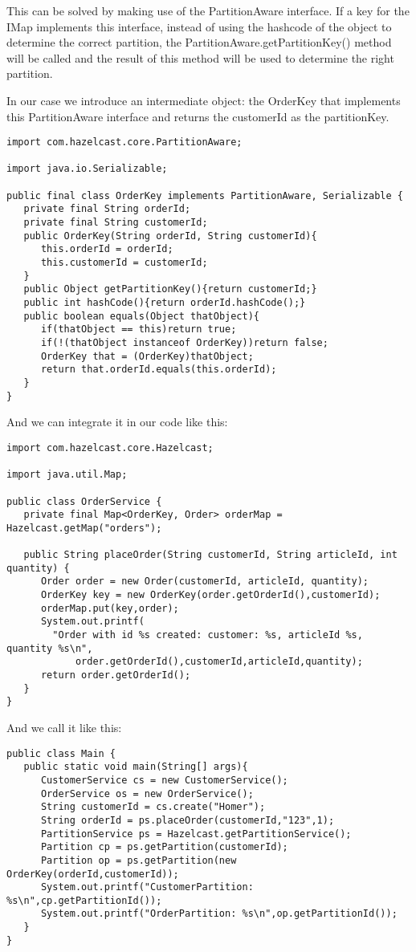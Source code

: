 This can be solved by making use of the PartitionAware interface. If a key for the IMap implements this interface, instead of using the hashcode of the object to determine the correct partition, the PartitionAware.getPartitionKey() method will be called and the result of this method will be used to determine the right partition.

In our case we introduce an intermediate object: the OrderKey that implements this PartitionAware interface and returns the customerId as the partitionKey.

\begin{verbatim}
import com.hazelcast.core.PartitionAware;

import java.io.Serializable;

public final class OrderKey implements PartitionAware, Serializable {
   private final String orderId;
   private final String customerId;
   public OrderKey(String orderId, String customerId){
      this.orderId = orderId;
      this.customerId = customerId;
   }
   public Object getPartitionKey(){return customerId;}
   public int hashCode(){return orderId.hashCode();}
   public boolean equals(Object thatObject){
      if(thatObject == this)return true;
      if(!(thatObject instanceof OrderKey))return false;
      OrderKey that = (OrderKey)thatObject;
      return that.orderId.equals(this.orderId);
   }
}
\end{verbatim}

And we can integrate it in our code like this:

\begin{verbatim}
import com.hazelcast.core.Hazelcast;

import java.util.Map;

public class OrderService {
   private final Map<OrderKey, Order> orderMap = Hazelcast.getMap("orders");

   public String placeOrder(String customerId, String articleId, int quantity) {
      Order order = new Order(customerId, articleId, quantity);
      OrderKey key = new OrderKey(order.getOrderId(),customerId);
      orderMap.put(key,order);
      System.out.printf(
		"Order with id %s created: customer: %s, articleId %s, quantity %s\n",
         	order.getOrderId(),customerId,articleId,quantity);
      return order.getOrderId();
   }
}
\end{verbatim}

And we call it like this:

\begin{verbatim}
public class Main {
   public static void main(String[] args){
      CustomerService cs = new CustomerService();
      OrderService os = new OrderService();
      String customerId = cs.create("Homer");
      String orderId = ps.placeOrder(customerId,"123",1);
      PartitionService ps = Hazelcast.getPartitionService();
      Partition cp = ps.getPartition(customerId);
      Partition op = ps.getPartition(new OrderKey(orderId,customerId));
      System.out.printf("CustomerPartition: %s\n",cp.getPartitionId());
      System.out.printf("OrderPartition: %s\n",op.getPartitionId());
   }
}
\end{verbatim}


